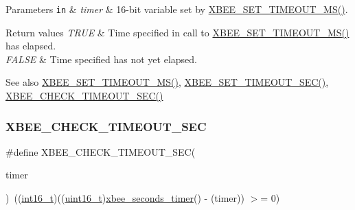 \begin{DoxyParams}[1]{Parameters}
\mbox{\tt in}  & {\em timer} & 16-\/bit variable set by \hyperlink{group__hal_ga848a9903fa7859d84cb22aeddde4c42f}{X\+B\+E\+E\+\_\+\+S\+E\+T\+\_\+\+T\+I\+M\+E\+O\+U\+T\+\_\+\+M\+S()}.\\
\hline
\end{DoxyParams}

\begin{DoxyRetVals}{Return values}
{\em T\+R\+UE} & Time specified in call to \hyperlink{group__hal_ga848a9903fa7859d84cb22aeddde4c42f}{X\+B\+E\+E\+\_\+\+S\+E\+T\+\_\+\+T\+I\+M\+E\+O\+U\+T\+\_\+\+M\+S()} has elapsed. \\
\hline
{\em F\+A\+L\+SE} & Time specified has not yet elapsed.\\
\hline
\end{DoxyRetVals}
\begin{DoxySeeAlso}{See also}
\hyperlink{group__hal_ga848a9903fa7859d84cb22aeddde4c42f}{X\+B\+E\+E\+\_\+\+S\+E\+T\+\_\+\+T\+I\+M\+E\+O\+U\+T\+\_\+\+M\+S()}, \hyperlink{group__hal_ga6adb5c9e19c84a261c569ff4d77d1170}{X\+B\+E\+E\+\_\+\+S\+E\+T\+\_\+\+T\+I\+M\+E\+O\+U\+T\+\_\+\+S\+E\+C()}, \hyperlink{group__hal_ga858c3c1caa899efd6af9ee8a0fe09246}{X\+B\+E\+E\+\_\+\+C\+H\+E\+C\+K\+\_\+\+T\+I\+M\+E\+O\+U\+T\+\_\+\+S\+E\+C()} 
\end{DoxySeeAlso}
\mbox{\label{group__hal_ga858c3c1caa899efd6af9ee8a0fe09246}} 
\subsubsection{\texorpdfstring{X\+B\+E\+E\+\_\+\+C\+H\+E\+C\+K\+\_\+\+T\+I\+M\+E\+O\+U\+T\+\_\+\+S\+EC}{XBEE\_CHECK\_TIMEOUT\_SEC}}
{\footnotesize\ttfamily \#define X\+B\+E\+E\+\_\+\+C\+H\+E\+C\+K\+\_\+\+T\+I\+M\+E\+O\+U\+T\+\_\+\+S\+EC(\begin{DoxyParamCaption}\item[{}]{timer }\end{DoxyParamCaption})~((\hyperlink{group__hal__dos_ga2140805d08462d474b82ddc8d1c2f3e6}{int16\+\_\+t})((\hyperlink{group__hal__dos_ga5a8b2dc9e45a9ee81a94ef304fb62505}{uint16\+\_\+t})\hyperlink{group__hal_ga5c1a8bccd41acf1d7264a75698077749}{xbee\+\_\+seconds\+\_\+timer}() -\/ (timer)) $>$= 0)}



